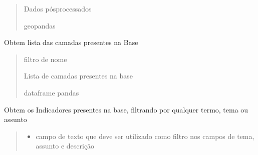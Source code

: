 \documentclass[letterpaper,10pt,brazil]{sphinxmanual}
\begin{document}
\begin{fulllineitems}
\begin{fulllineitems}
\begin{quote}
\begin{description}
\sphinxAtStartPar
Dados pós\sphinxhyphen{}processados

\sphinxAtStartPar
geopandas

\end{description}\end{quote}

\end{fulllineitems}


\begin{fulllineitems}
\label{\detokenize{api_gen/apiModulo.api_consulta:apiModulo.api_consulta.ApiConsulta.lstCamadas}}
\pysigstartsignatures
{}
\pysigstopsignatures
\sphinxAtStartPar
Obtem lista das camadas presentes na Base
\begin{quote}\begin{description}
\sphinxAtStartPar
{} \textendash{} filtro de nome

\sphinxAtStartPar
Lista de camadas presentes na base

\sphinxAtStartPar
dataframe \sphinxhyphen{} pandas

\end{description}\end{quote}

\end{fulllineitems}


\begin{fulllineitems}
\label{\detokenize{api_gen/apiModulo.api_consulta:apiModulo.api_consulta.ApiConsulta.lstIndicador}}
\pysigstartsignatures
{}
\pysigstopsignatures
\sphinxAtStartPar
Obtem os Indicadores presentes na base, filtrando por qualquer termo, tema ou assunto
\begin{quote}\begin{description}
\begin{itemize}
\item {} 
\sphinxAtStartPar
{} \textendash{} campo de texto que deve ser utilizado como filtro nos campos de tema, assunto e descrição


\end{itemize}
\end{description}
\end{quote}
\end{fulllineitems}
\end{fulllineitems}
\end{document}
